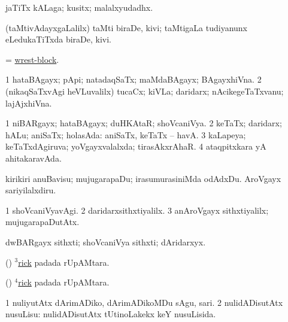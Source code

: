\bentry
{} 
\gl{\nA}
\expl{}
\bmng
jaTiTx kALaga; kusitx; malalxyudadhx. 
\emng
\eentry

\bentry
{} 
\gl{\nA}
\expl{}
\bmng
(taMtivAdayxgaLalilx) taMti biraDe, kivi; taMtigaLa tudiyanunx eLedukaTiTxda biraDe, kivi. 
\emng
\eentry

\bentry
{} 
\gl{\nA}
\expl{}
\bmng
= \hyperlink{wrest-block}{wrest-block}. 
\emng
\eentry

\bentry
{} 
\gl{\nA}
\expl{}
\bmng
\bnum
\num{1} hataBAgayx; pApi; natadaqSaTx; maMdaBAgayx; BAgayxhiVna. 
\num{2} (nikaqSaTxvAgi heVLuvalilx) tucaCx; kiVLa; daridarx; nAcikegeTaTxvanu; lajAjxhiVna. 
\enum
\emng
\eentry

\bentry
{} 
\gl{\gu}
\bmng
\bnum
\num{1} niBARgayx; hataBAgayx; duHKAtaR; shoVcaniVya. 
\num{2} keTaTx; daridarx; hALu; aniSaTx; holasAda:  aniSaTx, keTaTx -- havA. 
\num{3} kaLapeya; keTaTxdAgiruva; yoVgayxvalalxda; tirasAkxrAhaR. 
\num{4} ataqpitxkara yA ahitakaravAda. 
\enum
\emng

\noindent
\gl{\pagu}
\expl{}
\bmng
{} 
\banum
{} kirikiri anuBavisu; mujugarapaDu; irasumurasiniMda odAdxDu. 
 AroVgayx sariyilalxdiru. 
\eanum
\emng
\eentry

\bentry
{} 
\gl{\kirxvi}
\expl{}
\bmng
\bnum
\num{1} shoVcaniVyavAgi. 
\num{2} daridarxsithxtiyalilx. 
\num{3} anAroVgayx sithxtiyalilx; mujugarapaDutAtx. 
\enum
\emng
\eentry

\bentry
{} 
\gl{\nA}
\expl{}
\bmng
dwBARgayx sithxti; shoVcaniVya sithxti; dAridarxyx. 
\emng
\eentry

\bentry
{} 
\gl{\nA}
\bmng
(\birx) \hyperref{kandict_r.pdf}{R}{rick(3)}{$^3$rick} padada rUpAMtara. 
\emng
\eentry

\bentry
{} 
\gl{\sakirx}
\expl{}
\bmng
(\birx) \hyperref{kandict_r.pdf}{R}{rick(4)}{$^4$rick} padada rUpAMtara. 
\emng
\eentry

\bentry
{} 
\gl{\sakirx}
\expl{}
\bmng
\bnum
\num{1} nuliyutAtx dArimADiko, dArimADikoMDu sAgu, sari. 
\num{2} nulidADisutAtx nusuLisu:  nulidADisutAtx tUtinoLakekx keY nusuLisida. 
\enum
\emng

